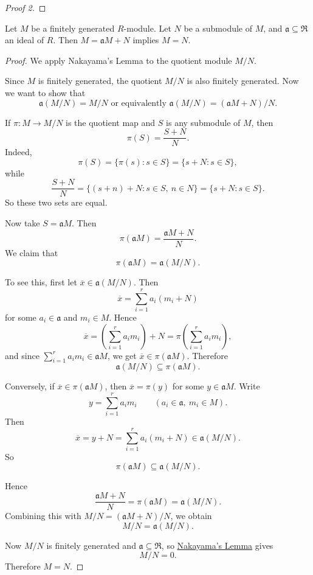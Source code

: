 \begin{proof}[Proof 2]
\end{proof}
\begin{corollary}
    Let \(M\) be a finitely generated \(R\)-module. Let \(N\) be a submodule of \(M\), and \(\mathfrak{a} \subseteq \mathfrak{R}\) an ideal of \(R\). Then \(M = \mathfrak{a} M + N \) implies \(M = N\).
\end{corollary}
\begin{proof}
    We apply Nakayama's Lemma to the quotient module $M/N$.

Since $M$ is finitely generated, the quotient $M/N$ is also finitely generated. Now we want to show that
\[
    \mathfrak{a}(M/N)= M/N \text{ or equivalently } \mathfrak{a}(M/N) = (\mathfrak{a}M + N) / N.
\]

If $\pi \colon M \to M/N$ is the quotient map and $S$ is any submodule of \( M \), then
\[
\pi(S)=\frac{S+N}{N}.
\]
Indeed,
\[
\pi(S)=\{\pi(s):s\in S\}=\{s+N:s\in S\},
\]
while
\[
\frac{S+N}{N}
= \{(s+n)+N : s\in S,\ n\in N\}
= \{s+N : s\in S\}.
\]
So these two sets are equal.

Now take $S=\mathfrak{a}M$. Then
\[
\pi(\mathfrak{a}M)= \frac{\mathfrak{a}M+N}{N}.
\]
We claim that
\[
\pi(\mathfrak{a}M)=\mathfrak{a}(M/N).
\]

To see this, first let $\overline{x}\in \mathfrak{a}(M/N)$. Then
\[
\overline{x}=\sum_{i=1}^r a_i(m_i+N)
\]
for some $a_i\in \mathfrak{a}$ and $m_i\in M$. Hence
\[
\overline{x}=\left(\sum_{i=1}^r a_i m_i\right)+N=\pi\left(\sum_{i=1}^r a_i m_i\right),
\]
and since $\sum_{i=1}^r a_i m_i\in \mathfrak{a}M$, we get $\overline{x}\in \pi(\mathfrak{a}M)$. Therefore
\[
\mathfrak{a}(M/N)\subseteq \pi(\mathfrak{a}M).
\]

Conversely, if $\overline{x}\in \pi(\mathfrak{a}M)$, then $\overline{x}=\pi(y)$ for some $y\in \mathfrak{a}M$. Write
\[
y=\sum_{i=1}^r a_i m_i
\qquad (a_i\in \mathfrak{a},\ m_i\in M).
\]
Then
\[
\overline{x}=y+N=\sum_{i=1}^r a_i(m_i+N)\in \mathfrak{a}(M/N).
\]
So
\[
\pi(\mathfrak{a}M)\subseteq \mathfrak{a}(M/N).
\]

Hence
\[
\frac{\mathfrak{a}M+N}{N}=\pi(\mathfrak{a}M)=\mathfrak{a}(M/N).
\]
Combining this with $M/N=(\mathfrak{a}M+N)/N$, we obtain
\[
M/N=\mathfrak{a}(M/N).
\]

Now $M/N$ is finitely generated and $\mathfrak{a}\subseteq \mathfrak{R}$, so \hyperref[lemma:nakayama]{Nakayama's Lemma} gives
\[
M/N=0.
\]
Therefore $M=N$.
\end{proof}
